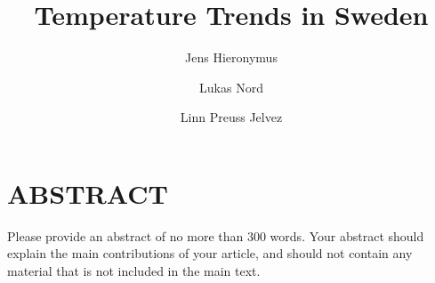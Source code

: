 \documentclass[fleqn,10pt]{olplainarticle}
\title{Temperature Trends in Sweden}
\author[1]{Jens Hieronymus}
\author[1]{Lukas Nord}
\author[1]{Linn Preuss Jelvez}
\affil[1]{Group 8}
\begin{document}
\maketitle



\flushbottom

\thispagestyle{empty}

\section*{ABSTRACT}
Please provide an abstract of no more than 300 words. Your abstract should explain the main contributions of your article, and should not contain any material that is not included in the main text.














%



\end{document}
